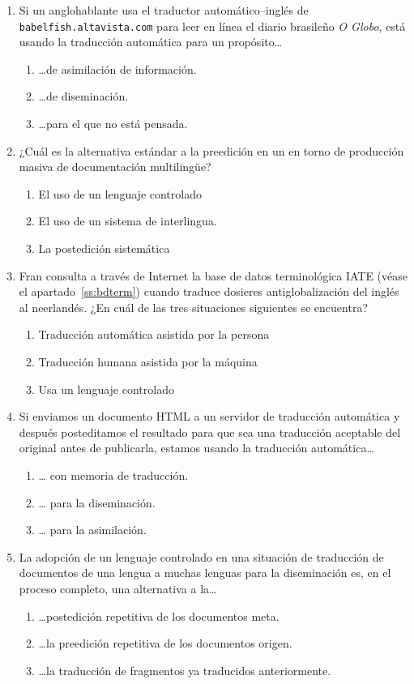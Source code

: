 \begin{enumerate}
\item Si un anglohablante usa el traductor automático--inglés de \verb|babelfish.altavista.com| para leer en línea el diario brasileño \emph{O Globo}, está usando la traducción automática para un propósito\ldots \begin{enumerate} \item \ldots de asimilación de información. \item \ldots de diseminación. \item \ldots para el que no está pensada. \end{enumerate} 

\item ¿Cuál es la alternativa estándar a la preedición en un en torno de producción masiva de documentación multilingüe? \begin{enumerate} \item El uso de un lenguaje controlado \item El uso de un sistema de interlingua. \item La postedición sistemática \end{enumerate} 

\item Fran consulta a través de Internet la base de datos terminológica IATE (véase el apartado~\ref{ss:bdterm}) cuando traduce dosieres antiglobalización del inglés al neerlandés. ¿En cuál de las tres situaciones siguientes se encuentra? \begin{enumerate} \item Traducción automática asistida por la persona \item Traducción humana asistida por la máquina \item Usa un lenguaje controlado \end{enumerate} 

\item Si enviamos un documento HTML a un servidor de traducción automática y después posteditamos el resultado para que sea una traducción aceptable del original antes de publicarla, estamos usando la traducción automática{\ldots} \begin{enumerate} \item {\ldots} con memoria de traducción. \item {\ldots} para la diseminación. \item {\ldots} para la asimilación. \end{enumerate} 

\item La adopción de un lenguaje controlado en una situación de traducción de documentos de una lengua a muchas lenguas para la diseminación es, en el proceso completo, una alternativa a la{\ldots} \begin{enumerate} \item {\ldots}postedición repetitiva de los documentos meta. \item {\ldots}la preedición repetitiva de los documentos origen. \item {\ldots}la traducción de fragmentos ya traducidos anteriormente. \end{enumerate} 


\end{enumerate}
